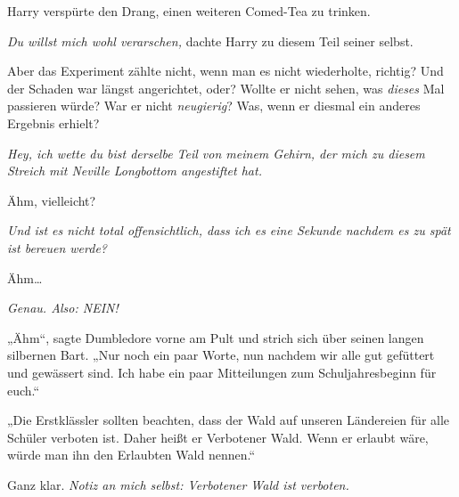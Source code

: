 Harry verspürte den Drang, einen weiteren Comed-Tea zu trinken.

\emph{Du \emph{willst} mich wohl verarschen,} dachte Harry zu diesem Teil seiner selbst.

Aber das Experiment zählte nicht, wenn man es nicht wiederholte, richtig? Und der Schaden war längst angerichtet, oder? Wollte er nicht sehen, was \emph{dieses} Mal passieren würde? War er nicht \emph{neugierig}? Was, wenn er diesmal ein anderes Ergebnis erhielt?

\emph{Hey, ich wette du bist derselbe Teil von meinem Gehirn, der mich zu diesem Streich mit Neville Longbottom angestiftet hat.}

Ähm, vielleicht?

\emph{Und ist es nicht total offensichtlich, dass ich es eine Sekunde nachdem es zu spät ist bereuen werde?}

Ähm…

\emph{Genau. Also: NEIN!}

„Ähm“, sagte Dumbledore vorne am Pult und strich sich über seinen langen silbernen Bart. „Nur noch ein paar Worte, nun nachdem wir alle gut gefüttert und gewässert sind. Ich habe ein paar Mitteilungen zum Schuljahresbeginn für euch.“

„Die Erstklässler sollten beachten, dass der Wald auf unseren Ländereien für alle Schüler verboten ist. Daher heißt er Verbotener Wald. Wenn er erlaubt wäre, würde man ihn den Erlaubten Wald nennen.“

Ganz klar. \emph{Notiz an mich selbst: Verbotener Wald ist verboten.}

